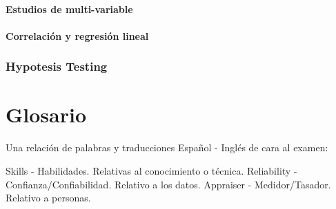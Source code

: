\documentclass[]{article}
\begin{document}
\subsection{Estudios de multi-variable}

\subsection{Correlación y regresión lineal}

\section{Hypotesis Testing}

\pagebreak[4]
\part{Glosario}

Una relación de palabras y traducciones Español - Inglés de cara al examen:

Skills - Habilidades. Relativas al conocimiento o técnica.
Reliability - Confianza/Confiabilidad. Relativo a los datos.
Appraiser - Medidor/Tasador. Relativo a personas.
\end{document}
